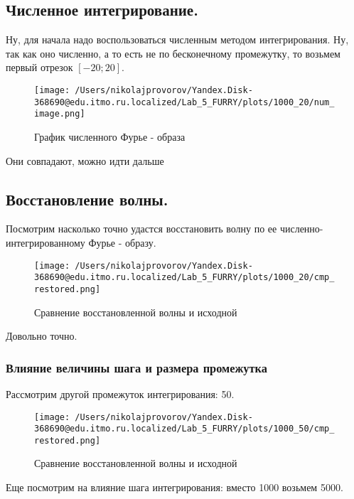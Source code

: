 \clearpage

\subsection{Численное интегрирование.}

Ну, для начала надо воспользоваться численным методом интегрирования. Ну, так как оно численно, а то есть не по бесконечному промежутку, то возьмем первый отрезок $[-20; 20]$.

\begin{figure}[ht]
    \centering
    \texttt{[image: /Users/nikolajprovorov/Yandex.Disk-368690@edu.itmo.ru.localized/Lab\_5\_FURRY/plots/1000\_20/num\_image.png]}
    \caption{График численного Фурье - образа}
\end{figure}

Они совпадают, можно идти дальше

\subsection{Восстановление волны.}

Посмотрим насколько точно удастся восстановить волну по ее численно-интегрированному Фурье - образу. 

\begin{figure}[ht]
    \centering
    \texttt{[image: /Users/nikolajprovorov/Yandex.Disk-368690@edu.itmo.ru.localized/Lab\_5\_FURRY/plots/1000\_20/cmp\_restored.png]}
    \caption{Сравнение восстановленной волны и исходной}
\end{figure}

Довольно точно.

\clearpage

\subsubsection{Влияние величины шага и размера промежутка}

Рассмотрим другой промежуток интегрирования: 50.

\begin{figure}[ht]
    \centering
    \texttt{[image: /Users/nikolajprovorov/Yandex.Disk-368690@edu.itmo.ru.localized/Lab\_5\_FURRY/plots/1000\_50/cmp\_restored.png]}
    \caption{Сравнение восстановленной волны и исходной}
\end{figure}

Еще посмотрим на влияние шага интегрирования: вместо 1000 возьмем 5000.


